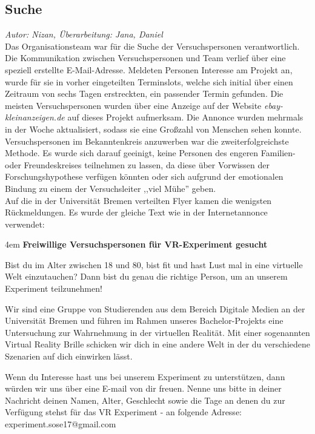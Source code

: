 \documentclass{Bericht}
\begin{document}
\subsection{Suche}
\textit{Autor: Nizan, Überarbeitung: Jana, Daniel}\\
Das Organisationsteam war für die Suche der Versuchspersonen verantwortlich. Die Kommunikation zwischen Versuchspersonen und Team verlief über eine speziell erstellte E-Mail-Adresse. Meldeten Personen Interesse am Projekt an, wurde für sie in vorher eingeteilten Terminslots, welche sich initial über einen Zeitraum von sechs Tagen erstreckten, ein passender Termin gefunden.
Die meisten Versuchspersonen wurden über eine Anzeige auf der Website \textit{ebay-kleinanzeigen.de} auf dieses Projekt aufmerksam. Die Annonce wurden mehrmals in der Woche aktualisiert, sodass sie eine Großzahl von Menschen sehen konnte.\\
Versuchspersonen im Bekanntenkreis anzuwerben war die zweiterfolgreichste Methode. Es wurde sich darauf geeinigt, keine Personen des engeren Familien- oder Freundeskreises teilnehmen zu lassen, da diese über Vorwissen der Forschungshypothese verfügen könnten oder sich aufgrund der emotionalen Bindung zu einem der Versuchsleiter ,,viel Mühe'' geben.\\
Auf die in der Universität Bremen verteilten Flyer kamen die wenigsten Rückmeldungen. Es wurde der gleiche Text wie in der Internetannonce verwendet:\\

\par
\begingroup
\leftskip4em
\textbf{Freiwillige Versuchspersonen für VR-Experiment gesucht}

Bist du im Alter zwischen 18 und 80, bist fit und hast Lust mal in eine virtuelle Welt einzutauchen? Dann bist du genau die richtige Person, um an unserem Experiment teilzunehmen!

Wir sind eine Gruppe von Studierenden aus dem Bereich Digitale Medien an der Universität Bremen und führen im Rahmen unseres Bachelor-Projekts eine Untersuchung zur Wahrnehmung in der virtuellen Realität. Mit einer sogenannten Virtual Reality Brille schicken wir dich in eine andere Welt in der du verschiedene Szenarien auf dich einwirken lässt.

Wenn du Interesse hast uns bei unserem Experiment zu unterstützen, dann würden wir uns über eine E-mail von dir freuen. Nenne uns bitte in deiner Nachricht deinen Namen, Alter, Geschlecht sowie die Tage an denen du zur Verfügung stehst für das VR Experiment - an folgende Adresse: experiment.sose17@gmail.com \\
\end{document}

